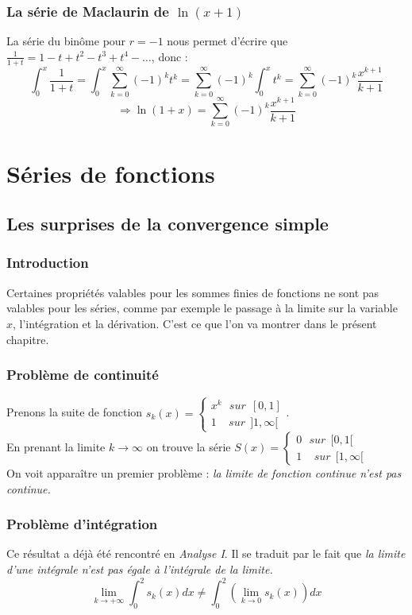 \documentclass[11pt, a4paper, openany]{book}
\newcommand{\series}{\sum_{k=0}^\infty}
\begin{document}
\subsection{La série de Maclaurin de $\ln(x+1)$}
La série du binôme pour $r=-1$ nous permet d'écrire que $\frac{1}{1+t}=1-t+t^2-t^3+t^4-\dots$, donc : $$\int_0^x\frac{1}{1+t}=\int_0^x\series(-1)^kt^k=\series(-1)^k\int_0^xt^k=\series(-1)^k\frac{x^{k+1}}{k+1}$$ $$\Rightarrow\ln(1+x)=\series(-1)^k\frac{x^{k+1}}{k+1}$$
					
					
					
					
					
\chapter{Séries de fonctions}
\section{Les surprises de la convergence simple}
\subsection{Introduction}
Certaines propriétés valables pour les sommes finies de fonctions ne sont pas valables pour les séries, comme par exemple le passage à la limite sur la variable $x$, l'intégration et la dérivation. C'est ce que l'on va montrer dans le présent chapitre.
					
\subsection{Problème de continuité}
Prenons la suite de fonction $s_k(x) = \left\{\begin{array}{l}
x^k\ \ \ sur\ \ [0,1]\\
1\ \ \ \ \ sur\ \ ]1,\infty[
\end{array}\right.$.\\
En prenant la limite $k \rightarrow \infty$ on trouve la série $S(x) = \left\{\begin{array}{l}
0\ \ \ sur\ \ [0,1[\\
	1\ \ \ \ \ sur\ \ [1,\infty[
		\end{array}\right.$\\
		On voit apparaître un premier problème :\textit{ la limite de fonction continue n'est pas  continue.}
							
		\subsection{Problème d'intégration}
		Ce résultat a déjà été rencontré en \textit{Analyse I}. Il se traduit par le fait que \textit{la limite d'une intégrale n'est pas égale à l'intégrale de la limite.}
		\begin{equation}
			\lim\limits_{k \rightarrow +\infty} \int_0^2 s_k(x) dx \neq \int_0^2 (\lim\limits_{k \rightarrow 0} s_k(x))dx
		\end{equation}
							
\end{document}

